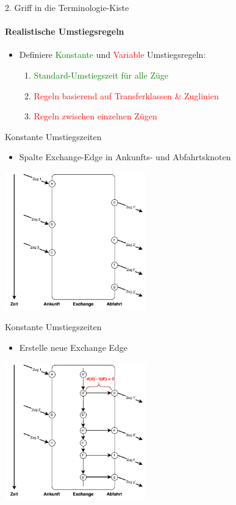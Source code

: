 \begin{frame}{2. Griff in die Terminologie-Kiste}
	\framesubtitle{Realistische Umstiegsregeln}
	\begin{itemize}
		\item Definiere \textcolor{green}{Konstante} und \textcolor{red}{Variable} Umstiegsregeln:
		\begin{enumerate}
			\item \textcolor{green}{Standard-Umstiegszeit für alle Züge}
			\item \textcolor{red}{Regeln basierend auf Transferklassen \& Zuglinien}
			\item \textcolor{red}{Regeln zwischen einzelnen Zügen}
		\end{enumerate}
	\end{itemize}
\end{frame}


\begin{frame}{Konstante Umstiegszeiten}
	\begin{itemize}
		\item Spalte Exchange-Edge in Ankunfts- und Abfahrtsknoten
	\end{itemize}

	\begin{center}
		\includegraphics[height=6cm]{images/time_expanded_constant_interchange_0.pdf} 
	\end{center}
\end{frame}


\begin{frame}{Konstante Umstiegszeiten}
	\begin{itemize}
		\item Erstelle neue Exchange Edge
	\end{itemize}

	\begin{center}
		\includegraphics[height=6cm]{images/time_expanded_constant_interchange_1.pdf} 
	\end{center}
\end{frame}


